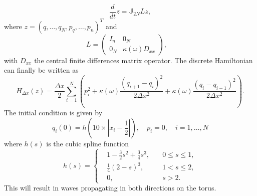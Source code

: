\begin{equation} \label{eq:NuRe:5}
	\frac{d}{dt} z = \mathbb{J}_{2N} L z,
\end{equation}
where $z=(q,\dots,q_N,p_q,\dots,p_n)^T$ and
\begin{equation} \label{eq:NuRe:6}
L = 
\begin{pmatrix}
	I_n & 0_N \\
	0_N & \kappa(\omega)D_{xx}
\end{pmatrix},\quad 
\end{equation}
with $D_{xx}$ the central finite differences matrix operator. The discrete Hamiltonian can finally be written as
\begin{equation} \label{eq:NuRe:7}
	H_{\Delta x}(z) = \frac{\Delta x}2 \sum_{i=1}^{N} \left( p_i^2 + \kappa(\omega) \frac{(q_{i+1} - q_i)^2}{2\Delta x ^ 2} + \kappa(\omega) \frac{(q_{i} - q_{i-1})^2}{2\Delta x ^ 2} \right).
\end{equation}
The initial condition is given by
\begin{equation} \label{eq:NuRe:8}
	q_i(0) = h( 10\times|x_i - \frac{1}{2}| ), \quad p_i = 0, \quad i=1,\dots,N
\end{equation}
where $h(s)$ is the cubic spline function
\begin{equation} \label{eq:NuRe:9}
h(s) = 
\left\{
\begin{aligned}
& 1 - \frac{3}{2}s^2 + \frac{3}{4}s^3, \quad & 0\leq s \leq 1, \\
& \frac{1}{4}(2-s)^3, & 1< s \leq 2, \\
& 0, & s > 2.
\end{aligned}
\right.
\end{equation}
This will result in waves propagating in both directions on the torus.

